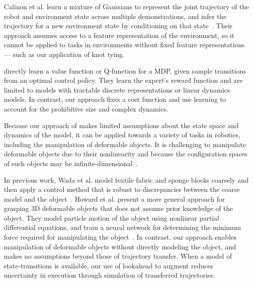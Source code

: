Calinon et al. learn a mixture of Gaussians to represent the joint trajectory of the robot and environment
state across multiple demonstrations, and infer the trajectory for a new
environment state by conditioning on that state~\cite{Calinon_SMC2007, Calinon_HUM2009}. Their approach
assumes access to a feature representation of the environment, so it cannot be applied to tasks in
environments without fixed feature representations --- such as our application of knot tying.

\citet{Dvijotham_ICML2010} directly
learn a value function or Q-function for a MDP, given sample transitions
from an optimal control policy. They learn the expert's 
reward function and are limited to models with tractable discrete representations 
or linear dynamics models.
In contrast, our approach fixes a cost function 
and use learning to account for the prohibitive size and
complex dynamics.


 
Because our approach of \mmql{} makes limited assumptions about the state space
and dynamics of the model, it can be applied towards a variety of tasks
in robotics, including the manipulation of deformable objects.
It is challenging to manipulate deformable objects due to their nonlinearity
and because the configuration spaces of such objects may be
infinite-dimensional~\cite{Lamiraux_IJRR2001}.

In previous work, Wada et al. model textile fabric and sponge blocks
coarsely and then apply a control method that is robust
to discrepancies between the coarse model and the
object~\cite{Wada_ArticMotion2000}. Howard et al. present a more
general approach for grasping 3D deformable objects
that does not assume prior knowledge of the object.
They model particle motion of the object using nonlinear partial differential
equations, and train a neural network for determining the minimum force
required for manipulating the object~\cite{Howard_AutRobots2000}.
In contrast, our approach enables manipulation of deformable objects
without directly modeling the object, and makes no assumptions beyond
those of trajectory transfer. When a model of state-transitions
is available, our use of
lookahead to augment \mmql{} reduces uncertainty in execution through
simulation of transferred trajectories.

